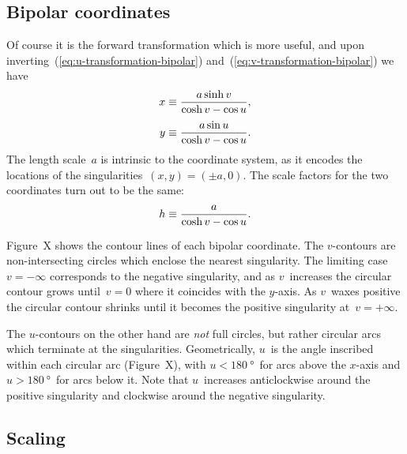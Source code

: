 \subsection{Bipolar coordinates}
\label{sec:bipolar.known.coordinates}

Of course it is the forward transformation which is more useful,
and upon inverting~(\ref{eq:u-transformation-bipolar})
and~(\ref{eq:v-transformation-bipolar})
we have
\begin{align}
  x &\ideq \frac{a \sinh v}{\cosh v - \cos u},
    \label{eq:x-transformation-bipolar}
    \\[\tallspace]
  y &\ideq \frac{a \sin u}{\cosh v - \cos u}.
    \label{eq:y-transformation-bipolar}
\end{align}
The length scale~$a$ is intrinsic to the coordinate system,
as it encodes the locations of the singularities~$(x, y) = (\pm a, 0)$.
The scale factors for the two coordinates turn out to be the same:
\begin{equation}
  \scalefac \ideq \frac{a}{\cosh v - \cos u}.
  \label{eq:scale-factor-bipolar}
\end{equation}

Figure~X shows the contour lines %
of each bipolar coordinate.
The $v$-contours are non-intersecting circles
which enclose the nearest singularity.
The limiting case~$v = -\infty$ corresponds to the negative singularity,
and as $v$~increases the circular contour grows until~$v = 0$
where it coincides with the $y$-axis.
As $v$~waxes positive the circular contour shrinks
until it becomes the positive singularity at~$v = +\infty$.

The $u$-contours on the other hand are \emph{not} full circles,
but rather circular arcs which terminate at the singularities.
Geometrically, $u$~is the angle inscribed within each circular arc
(Figure~X), %
with $u < \SI{180}{\degree}$~for arcs above the $x$-axis
and $u > \SI{180}{\degree}$~for arcs below it.
Note that $u$~increases anticlockwise around the positive singularity
and clockwise around the negative singularity.

\subsection{Scaling}
\label{sec:bipolar.known.scaling}

